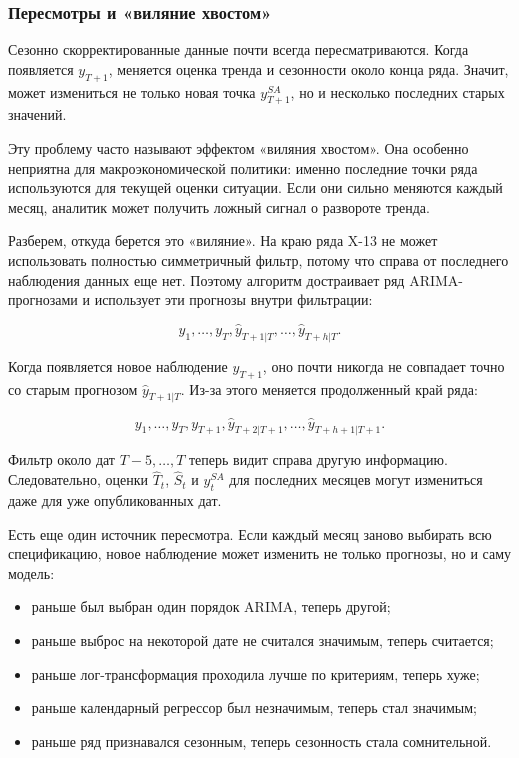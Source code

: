 \documentclass[12pt,fleqn]{article}
\begin{document}
\subsubsection{Пересмотры и «виляние хвостом»}

Сезонно скорректированные данные почти всегда пересматриваются.
Когда появляется \(y_{T+1}\), меняется оценка тренда и сезонности около конца ряда.
Значит, может измениться не только новая точка \(y_{T+1}^{SA}\), но и несколько последних старых значений.

Эту проблему часто называют эффектом «виляния хвостом».
Она особенно неприятна для макроэкономической политики: именно последние точки ряда используются для текущей оценки ситуации.
Если они сильно меняются каждый месяц, аналитик может получить ложный сигнал о развороте тренда.

Разберем, откуда берется это «виляние».
На краю ряда X-13 не может использовать полностью симметричный фильтр, потому что справа от последнего наблюдения данных еще нет.
Поэтому алгоритм достраивает ряд ARIMA-прогнозами и использует эти прогнозы внутри фильтрации:

\[
y_1,\ldots,y_T,
\hat y_{T+1|T},\ldots,\hat y_{T+h|T}.
\]

Когда появляется новое наблюдение \(y_{T+1}\), оно почти никогда не совпадает точно со старым прогнозом \(\hat y_{T+1|T}\).
Из-за этого меняется продолженный край ряда:

\[
y_1,\ldots,y_T,
y_{T+1},
\hat y_{T+2|T+1},\ldots,\hat y_{T+h+1|T+1}.
\]

Фильтр около дат \(T-5,\ldots,T\) теперь видит справа другую информацию.
Следовательно, оценки \(\hat T_t\), \(\hat S_t\) и \(y_t^{SA}\) для последних месяцев могут измениться даже для уже опубликованных дат.

Есть еще один источник пересмотра.
Если каждый месяц заново выбирать всю спецификацию, новое наблюдение может изменить не только прогнозы, но и саму модель:

\begin{itemize}
  \item раньше был выбран один порядок ARIMA, теперь другой;
  \item раньше выброс на некоторой дате не считался значимым, теперь считается;
  \item раньше лог-трансформация проходила лучше по критериям, теперь хуже;
  \item раньше календарный регрессор был незначимым, теперь стал значимым;
  \item раньше ряд признавался сезонным, теперь сезонность стала сомнительной.
\end{itemize}
\end{document}
